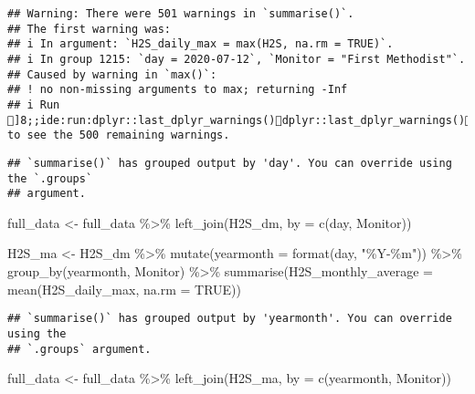 \documentclass[
]{article}
\newenvironment{Shaded}{\begin{snugshade}}{\end{snugshade}}
\newcommand{\AttributeTok}[1]{\textcolor[rgb]{0.77,0.63,0.00}{#1}}
\newcommand{\ConstantTok}[1]{\textcolor[rgb]{0.00,0.00,0.00}{#1}}
\newcommand{\FunctionTok}[1]{\textcolor[rgb]{0.00,0.00,0.00}{#1}}
\newcommand{\NormalTok}[1]{#1}
\newcommand{\OtherTok}[1]{\textcolor[rgb]{0.56,0.35,0.01}{#1}}
\newcommand{\SpecialCharTok}[1]{\textcolor[rgb]{0.00,0.00,0.00}{#1}}
\newcommand{\StringTok}[1]{\textcolor[rgb]{0.31,0.60,0.02}{#1}}
\begin{document}
\begin{verbatim}
## Warning: There were 501 warnings in `summarise()`.
## The first warning was:
## i In argument: `H2S_daily_max = max(H2S, na.rm = TRUE)`.
## i In group 1215: `day = 2020-07-12`, `Monitor = "First Methodist"`.
## Caused by warning in `max()`:
## ! no non-missing arguments to max; returning -Inf
## i Run ]8;;ide:run:dplyr::last_dplyr_warnings()dplyr::last_dplyr_warnings()]8;; to see the 500 remaining warnings.
\end{verbatim}

\begin{verbatim}
## `summarise()` has grouped output by 'day'. You can override using the `.groups`
## argument.
\end{verbatim}

\begin{Shaded}
\begin{Highlighting}[]
\NormalTok{full\_data }\OtherTok{\textless{}{-}}\NormalTok{ full\_data }\SpecialCharTok{\%\textgreater{}\%}
  \FunctionTok{left\_join}\NormalTok{(H2S\_dm, }\AttributeTok{by =} \FunctionTok{c}\NormalTok{(}\StringTok{\textquotesingle{}day\textquotesingle{}}\NormalTok{, }\StringTok{\textquotesingle{}Monitor\textquotesingle{}}\NormalTok{))}
\end{Highlighting}
\end{Shaded}

\begin{Shaded}
\begin{Highlighting}[]
\NormalTok{H2S\_ma }\OtherTok{\textless{}{-}}\NormalTok{ H2S\_dm }\SpecialCharTok{\%\textgreater{}\%}
  \FunctionTok{mutate}\NormalTok{(}\AttributeTok{yearmonth =} \FunctionTok{format}\NormalTok{(day, }\StringTok{"\%Y{-}\%m"}\NormalTok{)) }\SpecialCharTok{\%\textgreater{}\%}
  \FunctionTok{group\_by}\NormalTok{(yearmonth, Monitor) }\SpecialCharTok{\%\textgreater{}\%}
  \FunctionTok{summarise}\NormalTok{(}\AttributeTok{H2S\_monthly\_average =} \FunctionTok{mean}\NormalTok{(H2S\_daily\_max, }\AttributeTok{na.rm =} \ConstantTok{TRUE}\NormalTok{))}
\end{Highlighting}
\end{Shaded}

\begin{verbatim}
## `summarise()` has grouped output by 'yearmonth'. You can override using the
## `.groups` argument.
\end{verbatim}

\begin{Shaded}
\begin{Highlighting}[]
\NormalTok{full\_data }\OtherTok{\textless{}{-}}\NormalTok{ full\_data }\SpecialCharTok{\%\textgreater{}\%}
  \FunctionTok{left\_join}\NormalTok{(H2S\_ma, }\AttributeTok{by =} \FunctionTok{c}\NormalTok{(}\StringTok{\textquotesingle{}yearmonth\textquotesingle{}}\NormalTok{, }\StringTok{\textquotesingle{}Monitor\textquotesingle{}}\NormalTok{))}
\end{Highlighting}
\end{Shaded}
\end{document}
